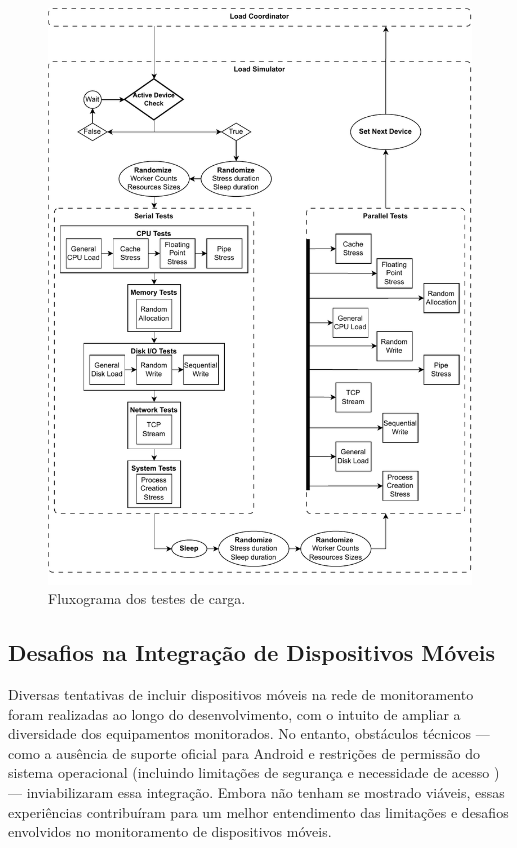 \begin{figure}[H]
\centering
\color{red}
\setlength{\abovecaptionskip}{-10pt}
\includegraphics[width=\textwidth]{Imagens/chap03/load_flowchart.pdf}
\caption{Fluxograma dos testes de carga.}
\label{fig:FluxogramaCarga}
\end{figure}

\newpage

\subsection{Desafios na Integração de Dispositivos Móveis}
\label{subsection:DesafiosDispositivosMoveis}

Diversas tentativas de incluir dispositivos móveis na rede de monitoramento foram realizadas ao longo do desenvolvimento, com o intuito de ampliar a diversidade dos equipamentos monitorados. No entanto, obstáculos técnicos --- como a ausência de suporte oficial para Android e restrições de permissão do sistema operacional (incluindo limitações de segurança e necessidade de acesso ) --- inviabilizaram essa integração. Embora não tenham se mostrado viáveis, essas experiências contribuíram para um melhor entendimento das limitações e desafios envolvidos no monitoramento de dispositivos móveis.

